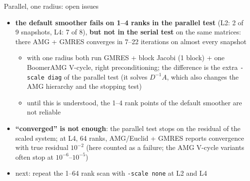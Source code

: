\begin{frame}{Parallel, one radius: open issues}
    \small
    \begin{itemize}
        \item \textbf{the default smoother fails on 1--4 ranks in the parallel test}
              (L2: 2 of 9 snapshots, L4: 7 of 8), \textbf{but not in the serial test} on the same matrices:
              there AMG + GMRES converges in 7--22 iterations on almost every snapshot
        \begin{itemize}
            \item with one radius both run GMRES + block Jacobi (1 block) + one BoomerAMG V-cycle, right
                  preconditioning; the difference is the extra \texttt{-scale diag} of the parallel test
                  (it solves $D^{-1}A$, which also changes the AMG hierarchy and the stopping test)
            \item until this is understood, the 1--4 rank points of the default smoother are not reliable
        \end{itemize}
        \item \textbf{``converged'' is not enough}: the parallel test stops on the residual of the scaled
              system; at L4, 64 ranks, AMG/Euclid + GMRES reports convergence with true residual $10^{-2}$
              (here counted as a failure; the AMG V-cycle variants often stop at $10^{-6}$--$10^{-5}$)
        \item next: repeat the 1--64 rank scan with \texttt{-scale none} at L2 and L4
    \end{itemize}
\end{frame}
